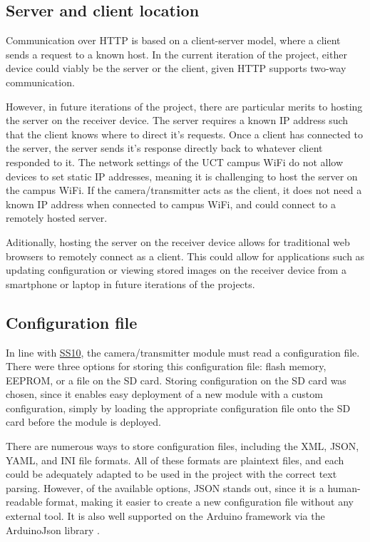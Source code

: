 \documentclass[class=report,11pt,crop=false]{standalone}
\begin{document}
\subsection{Server and client location}

Communication over HTTP is based on a client-server model, where a client sends a request to a known host. In the current iteration of the project, either device could viably be the server or the client, given HTTP supports two-way communication. 

However, in future iterations of the project, there are particular merits to hosting the server on the receiver device. The server requires a known IP address such that the client knows where to direct it's requests. Once a client has connected to the server, the server sends it's response directly back to whatever client responded to it. The network settings of the UCT campus WiFi do not allow devices to set static IP addresses, meaning it is challenging to host the server on the campus WiFi. If the camera/transmitter acts as the client, it does not need a known IP address when connected to campus WiFi, and could connect to a remotely hosted server.

Aditionally, hosting the server on the receiver device allows for traditional web browsers to remotely connect as a client. This could allow for applications such as updating configuration or viewing stored images on the receiver device from a smartphone or laptop in future iterations of the projects.

\subsection{Configuration file} \label{ss:fwconfig}

In line with \hyperlink{tab:firmware-requirements}{SS10}, the camera/transmitter module must read a configuration file. There were three options for storing this configuration file: flash memory, EEPROM, or a file on the SD card. Storing configuration on the SD card was chosen, since it enables easy deployment of a new module with a custom configuration, simply by loading the appropriate configuration file onto the SD card before the module is deployed.

There are numerous ways to store configuration files, including the XML, JSON, YAML, and INI file formats. All of these formats are plaintext files, and each could be adequately adapted to be used in the project with the correct text parsing. However, of the available options, JSON stands out, since it is a human-readable format, making it easier to create a new configuration file without any external tool. It is also well supported on the Arduino framework via the ArduinoJson library \cite{blanchon2019arduino}.
\end{document}
